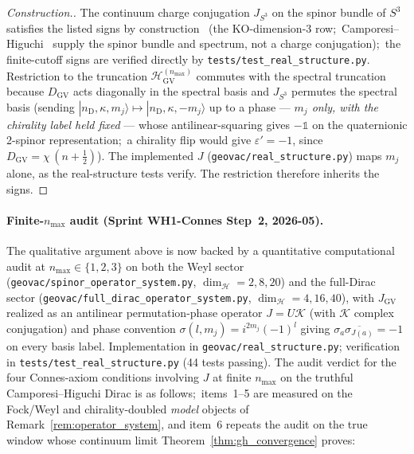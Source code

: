 \documentclass[11pt]{article}
\begin{document}
\begin{proof}[Construction.]
The continuum charge conjugation $J_{S^3}$ on the spinor bundle of
$S^3$ satisfies the listed signs by construction~\cite{connes1995}
(the KO-dimension-3 row;\ Camporesi--Higuchi~\cite{camporesi_higuchi1996}
supply the spinor bundle and spectrum, not a charge conjugation);\ the
finite-cutoff signs are verified directly by
\texttt{tests/test\_real\_structure.py}.  Restriction to
the truncation $\mathcal{H}_{\mathrm{GV}}^{(n_{\max})}$ commutes with
the spectral truncation because $D_{\mathrm{GV}}$ acts diagonally in
the spectral basis and $J_{S^3}$ permutes the spectral basis (sending
$|n_{\mathrm{D}}, \kappa, m_j\rangle \mapsto
|n_{\mathrm{D}}, \kappa, -m_j\rangle$ up to a phase --- \emph{$m_j$ only,
with the chirality label held fixed} --- whose antilinear-squaring gives
$-\mathbb{1}$ on the quaternionic 2-spinor representation;\ a
chirality flip would give $\varepsilon' = -1$, since $D_{\mathrm{GV}} =
\chi\,(n + \tfrac12)$).  The implemented $J$
(\texttt{geovac/real\_structure.py}) maps $m_j$ alone, as the
real-structure tests verify.  The restriction therefore inherits the signs.
\end{proof}

\paragraph{Finite-$n_{\max}$ audit (Sprint WH1-Connes Step~2,
2026-05).}  The qualitative argument above is now backed by a
quantitative computational audit at $n_{\max} \in \{1, 2, 3\}$ on
both the Weyl sector
(\texttt{geovac/spinor\_operator\_system.py}, $\dim_{\mathcal{H}} = 2,
8, 20$) and the full-Dirac sector
(\texttt{geovac/full\_dirac\_operator\_system.py},
$\dim_{\mathcal{H}} = 4, 16, 40$), with
$J_{\mathrm{GV}}$ realized as an antilinear permutation-phase operator
$J = U \mathcal{K}$ (with $\mathcal{K}$ complex conjugation) and phase
convention $\sigma(l, m_j) = i^{2 m_j} (-1)^l$ giving
$\sigma_a \overline{\sigma_{J(a)}} = -1$ on every basis label.
Implementation in \texttt{geovac/real\_structure.py};
verification in \texttt{tests/test\_real\_structure.py}
(44 tests passing).
The audit verdict for the four Connes-axiom conditions involving $J$
at finite $n_{\max}$ on the truthful Camporesi--Higuchi Dirac is as
follows;\ items~1--5 are measured on the Fock/Weyl and chirality-doubled
\emph{model} objects of Remark~\ref{rem:operator_system}, and item~6
repeats the audit on the true window whose continuum limit
Theorem~\ref{thm:gh_convergence} proves:
\end{document}

